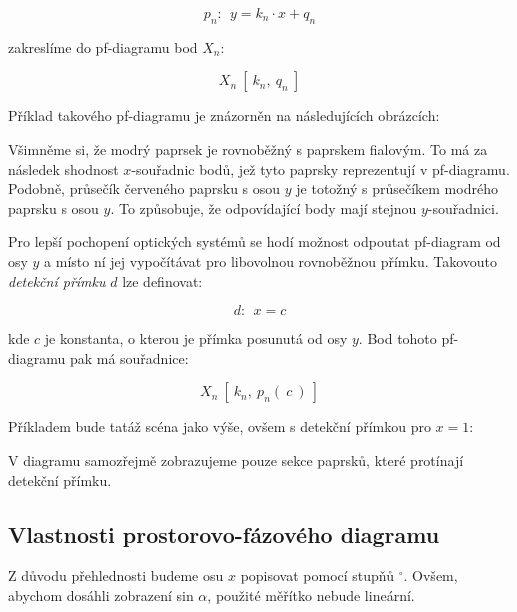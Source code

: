 \[ p_n:\ \ y = k_n \cdot x + q_n \]

zakreslíme do pf-diagramu bod $X_n$: 

\[ X_n\ [\ k_n,\ q_n\ ] \]

Příklad takového pf-diagramu je znázorněn na následujících obrázcích:




Všimněme si, že modrý paprsek je rovnoběžný s paprskem fialovým. To má za následek shodnost $x$-souřadnic bodů, jež tyto paprsky reprezentují v pf-diagramu. Podobně, průsečík červeného paprsku s osou $y$ je totožný s průsečíkem modrého paprsku s osou $y$. To způsobuje, že odpovídající body mají stejnou $y$-souřadnici.

Pro lepší pochopení optických systémů se hodí možnost odpoutat pf-diagram od osy $y$ a místo ní jej vypočítávat pro libovolnou rovnoběžnou přímku. Takovouto \emph{detekční přímku} $d$ lze definovat:

\[ d:\ \ x = c \]

kde $c$ je konstanta, o kterou je přímka posunutá od osy $y$. Bod tohoto pf-diagramu pak má souřadnice:

\[ X_n\ [\ k_n,\ p_n(\ c\ )\ ] \]

Příkladem bude tatáž scéna jako výše, ovšem s detekční přímkou pro $x = 1$:




V diagramu samozřejmě zobrazujeme pouze sekce paprsků, které protínají detekční přímku.

\subsection{Vlastnosti prostorovo-fázového diagramu}

Z důvodu přehlednosti budeme osu $x$ popisovat pomocí stupňů $^{\circ}$. Ovšem, abychom dosáhli zobrazení sin $\alpha$, použité měřítko nebude lineární.

